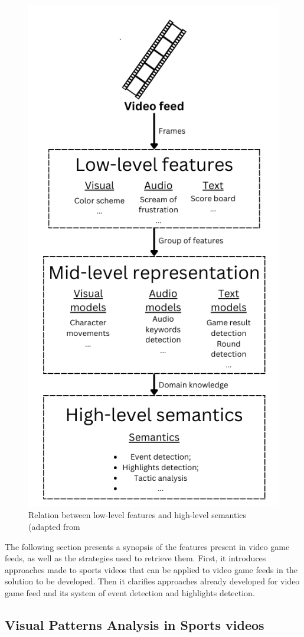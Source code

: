     \begin{figure}[htbp]
        \centering
        \includegraphics[width=0.7\linewidth]{Chapters/Figures/Relationship_Events.png}
        \caption{Relation between low-level features and high-level semantics (adapted from \cite{AutomaticEventDetectionTennis}}
        \label{fig:LLF_HLS_realtion}
    \end{figure}

    The following section presents a synopsis of the features present in video game feeds, as well as the strategies used to retrieve them. First, it introduces approaches made to sports videos that can be applied to video game feeds in the solution to be developed. Then it clarifies approaches already developed for video game feed and its system of event detection and highlights detection.

\subsection{Visual Patterns Analysis in Sports videos}

